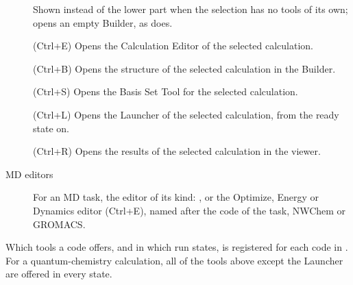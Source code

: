 \begin{description}
	\item[] Shown instead of the lower part when the selection has no tools of its own; opens an empty Builder, as  does.
	\item[] (\textsf{Ctrl+E}) Opens the Calculation Editor of the selected calculation.
	\item[] (\textsf{Ctrl+B}) Opens the structure of the selected calculation in the Builder.
	\item[] (\textsf{Ctrl+S}) Opens the Basis Set Tool for the selected calculation.
	\item[] (\textsf{Ctrl+L}) Opens the Launcher of the selected calculation, from the ready state on.
	\item[] (\textsf{Ctrl+R}) Opens the results of the selected calculation in the viewer.
	\item[MD editors] For an MD task, the editor of its kind: , or the Optimize, Energy or Dynamics editor (\textsf{Ctrl+E}), named after the code of the task, NWChem or GROMACS.
\end{description}
Which tools a code offers, and in which run states, is registered for each code in . For a quantum-chemistry calculation, all of the tools above except the Launcher are offered in every state.

